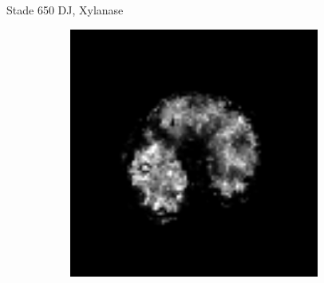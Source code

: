 \documentclass[10pt]{beamer}
\begin{document}
\begin{frame}{Stade 650 DJ, Xylanase}
\begin{figure}[ht]
\begin{subfigure}[t]{0.33\textwidth}
      
    \end{subfigure}%
    \begin{subfigure}[t]{0.33\textwidth}
      \centering
      \includegraphics[width=0.9\textwidth]{fig/stats_650Xyl_density}

    \end{subfigure}%
    
  \end{figure}
\end{frame}
\end{document}
